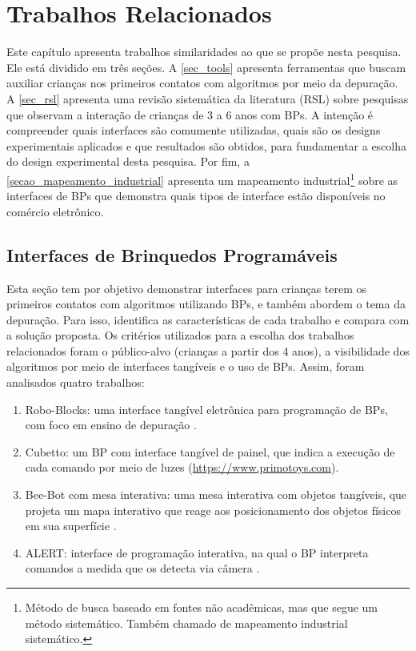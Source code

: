 \chapter{Trabalhos Relacionados}
\label{c_estado_arte}

Este capítulo apresenta trabalhos similaridades ao que se propõe nesta pesquisa. Ele está dividido em três seções. A \autoref{sec_tools} apresenta ferramentas que buscam auxiliar crianças nos primeiros contatos com algoritmos por meio da depuração. A \autoref{sec_rsl} apresenta uma revisão sistemática da literatura (RSL) sobre pesquisas que observam a interação de crianças de 3 a 6 anos com BPs. A intenção é compreender quais interfaces são comumente utilizadas, quais são os designs experimentais aplicados e que resultados são obtidos, para fundamentar a escolha do design experimental desta pesquisa. Por fim, a \autoref{secao_mapeamento_industrial} apresenta um mapeamento industrial\footnote{Método de busca baseado em fontes não acadêmicas, mas que segue um método sistemático. Também chamado de mapeamento industrial sistemático.} sobre as interfaces de BPs que demonstra quais tipos de interface estão disponíveis no comércio eletrônico. %

\section{Interfaces de Brinquedos Programáveis}
\label{sec_tools}
Esta seção tem por objetivo demonstrar interfaces para crianças terem os primeiros contatos com algoritmos utilizando BPs, e também abordem o tema da depuração. Para isso, identifica as características de cada trabalho e compara com a solução proposta. Os critérios utilizados para a escolha dos trabalhos relacionados foram o público-alvo (crianças a partir dos 4 anos), a visibilidade dos algoritmos por meio de interfaces tangíveis e o uso de BPs. Assim, foram analisados quatro trabalhos:

\begin{enumerate}
    \item Robo-Blocks: uma interface tangível eletrônica para programação de BPs, com foco em ensino de depuração \cite{sipitakiat_robo-blocks_2012}.
    \item Cubetto: um BP com interface tangível de painel, que indica a execução de cada comando por meio de luzes (\url{https://www.primotoys.com}).
    \item Bee-Bot com mesa interativa: uma mesa interativa com objetos tangíveis, que projeta um mapa interativo que reage aos posicionamento dos objetos físicos em sua superfície \cite{beraza_soft_2010}. 
    \item ALERT: interface de programação interativa, na qual o BP interpreta comandos a medida que os detecta via câmera \cite{burleson_active_2018}. 
\end{enumerate}

